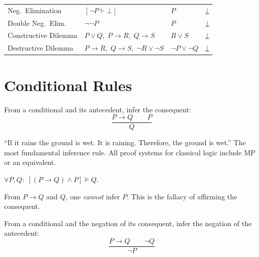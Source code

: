 \begin{tcolorbox}[colback=gray!6, colframe=gray!40, arc=2pt,
  left=6pt, right=6pt, top=4pt, bottom=4pt,
  title={\small\textbf{Inference Rules — Quick Reference}},
  fonttitle=\small\bfseries]
\begin{tabular}{l l l l}
Neg.\ Elimination         & $[\neg P\vdash\bot]$       & $P$                & \hyperref[def:neg-e]{↓} \\
Double Neg.\ Elim.        & $\neg\neg P$               & $P$                & \hyperref[def:dne]{↓} \\
Constructive Dilemma      & $P\vee Q,\;P\to R,\;Q\to S$ & $R\vee S$        & \hyperref[def:cd]{↓} \\
Destructive Dilemma       & $P\to R,\;Q\to S,\;\neg R\vee\neg S$ & $\neg P\vee\neg Q$ & \hyperref[def:dd]{↓} \\
\bottomrule
\end{tabular}
\end{tcolorbox}

\vspace{1em}


\section*{Conditional Rules}

\begin{definition}\label{def:mp}
From a conditional and its antecedent, infer the consequent:
\[
\frac{P \rightarrow Q \qquad P}{Q}
\]
\end{definition}

\begin{remark}[Intuition] ``If it rains the ground is wet. It is raining.
Therefore, the ground is wet.'' The most fundamental inference rule. All
proof systems for classical logic include MP or an equivalent.
\end{remark}
\begin{remark}
$\forall P, Q:\; [(P \rightarrow Q) \wedge P] \models Q$.
\end{remark}
\begin{remark}
From $P \rightarrow Q$ and $Q$, one \emph{cannot} infer $P$. This is the
fallacy of affirming the consequent.
\end{remark}

\begin{definition}\label{def:mt}
From a conditional and the negation of its consequent, infer the negation of
the antecedent:
\[
\frac{P \rightarrow Q \qquad \neg Q}{\neg P}
\]
\end{definition}

